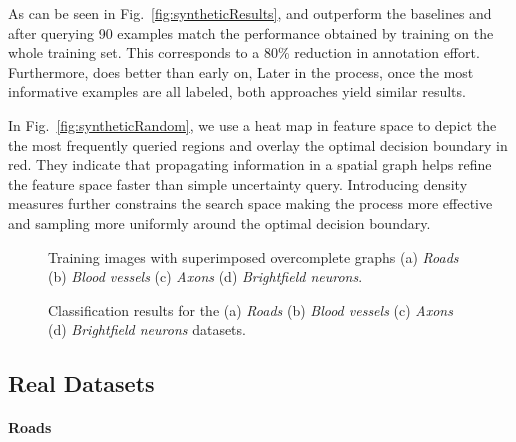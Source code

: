 \documentclass[10pt,twocolumn,letterpaper]{article}
\begin{document}
As can be  seen in Fig.~\ref{fig:syntheticResults}, \PPS{}  and \DPS{} outperform
the baselines and  after querying 90 examples match the  performance obtained by
training on  the whole training  set.  This corresponds  to a 80\%  reduction in
annotation effort. Furthermore,  \DPS{} does better than \PPS{}  early on, Later
in  the process,  once  the  most informative  examples are all labeled,  both
approaches yield similar results.

In Fig.~\ref{fig:syntheticRandom},  we use  a heat  map in feature space to  depict the  the most
frequently queried  regions and  overlay the optimal  decision boundary  in red.
They indicate that  propagating information in a spatial graph  helps refine the
feature  space  faster  than  simple  uncertainty  query.   Introducing  density
measures further constrains  the search space making the  process more effective
and  sampling  more uniformly  around the optimal decision boundary. 

\begin{figure*}[t]
\centering
{}\hspace{0.5em}
\hspace{0.5em}
\hspace{0.5em}
\caption{Training images with superimposed overcomplete graphs (a) \textit{Roads} (b)  \textit{Blood vessels} (c) \textit{Axons} (d) \textit{Brightfield neurons}.}
\vspace{-5mm} 
\end{figure*}\begin{figure*}[t]
\centering
{}
\caption{Classification results for the (a) \textit{Roads}  (b) \textit{Blood vessels} (c) \textit{Axons} (d) \textit{Brightfield neurons} datasets.}
\vspace{-3mm}
\end{figure*}\subsection{Real Datasets}\label{sec:real}\paragraph{Roads}
\end{document}
